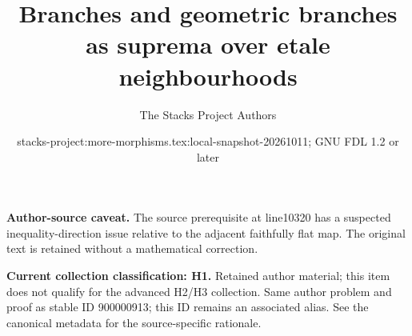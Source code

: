 \documentclass[10pt,a4paper]{amsart}
\title{Branches and geometric branches as suprema over etale neighbourhoods}
\author{The Stacks Project Authors}
\date{stacks-project:more-morphisms.tex:local-snapshot-20261011; GNU FDL 1.2 or later}
\theoremstyle{plain}
\theoremstyle{definition}
\theoremstyle{remark}
\numberwithin{equation}{subsection}
\begin{document}
\maketitle
\par\medskip\noindent\textbf{Author-source caveat.} The source prerequisite at line10320 has a suspected inequality-direction issue relative to the adjacent faithfully flat map. The original text is retained without a mathematical correction.\par\medskip

\par\medskip\noindent\textbf{Current collection classification: H1.} Retained author material; this item does not qualify for the advanced H2/H3 collection. Same author problem and proof as stable ID 900000913; this ID remains an associated alias. See the canonical metadata for the source-specific rationale.\par\medskip
\end{document}
